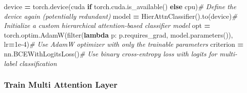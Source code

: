 \documentclass[
]{article}
\newenvironment{Shaded}{\begin{snugshade}}{\end{snugshade}}
\newcommand{\BuiltInTok}[1]{#1}
\newcommand{\CommentTok}[1]{\textcolor[rgb]{0.56,0.35,0.01}{\textit{#1}}}
\newcommand{\ControlFlowTok}[1]{\textcolor[rgb]{0.13,0.29,0.53}{\textbf{#1}}}
\newcommand{\FloatTok}[1]{\textcolor[rgb]{0.00,0.00,0.81}{#1}}
\newcommand{\KeywordTok}[1]{\textcolor[rgb]{0.13,0.29,0.53}{\textbf{#1}}}
\newcommand{\NormalTok}[1]{#1}
\newcommand{\OperatorTok}[1]{\textcolor[rgb]{0.81,0.36,0.00}{\textbf{#1}}}
\newcommand{\StringTok}[1]{\textcolor[rgb]{0.31,0.60,0.02}{#1}}
\begin{document}
\begin{Shaded}
\begin{Highlighting}[]
\NormalTok{device }\OperatorTok{=}\NormalTok{ torch.device(}\StringTok{\textquotesingle{}cuda\textquotesingle{}} \ControlFlowTok{if}\NormalTok{ torch.cuda.is\_available() }\ControlFlowTok{else} \StringTok{\textquotesingle{}cpu\textquotesingle{}}\NormalTok{)}\CommentTok{\# Define the device again (potentially redundant)}
\NormalTok{model }\OperatorTok{=}\NormalTok{ HierAttnClassifier().to(device)}\CommentTok{\# Initialize a custom hierarchical attention{-}based classifier model}
\NormalTok{opt }\OperatorTok{=}\NormalTok{ torch.optim.AdamW(}\BuiltInTok{filter}\NormalTok{(}\KeywordTok{lambda}\NormalTok{ p: p.requires\_grad, model.parameters()), lr}\OperatorTok{=}\FloatTok{1e{-}4}\NormalTok{)}\CommentTok{\# Use AdamW optimizer with only the trainable parameters}
\NormalTok{criterion }\OperatorTok{=}\NormalTok{ nn.BCEWithLogitsLoss()}\CommentTok{\# Use binary cross{-}entropy loss with logits for multi{-}label classification}
\end{Highlighting}
\end{Shaded}

\subsubsection{Train Multi Attention
Layer}\label{train-multi-attention-layer}
\end{document}
